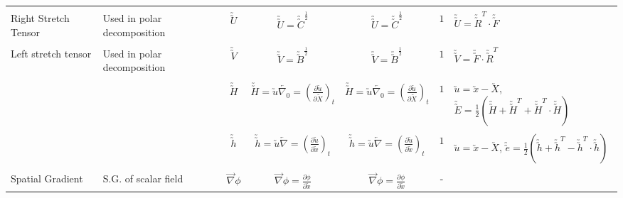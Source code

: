 \documentclass[10pt]{article}
\begin{document}
\begin{center}
\begin{tabular}{l m{3in} c c c c m{5in}}
\\[1ex]
\hline
\\[-1ex]
Right Stretch Tensor
&%
Used in polar decomposition
&%
$ \utilde{\utilde{U}} $
&%
$ \utilde{\utilde{U}} =\utilde{\utilde{C}}^{\frac{1}{2}}$
&%
$ \utilde{\utilde{U}} =\utilde{\utilde{C}}^{\frac{1}{2}}$
&%
$ 1 $
&%
$\utilde{\utilde{U}}=\utilde{\utilde{R}}^{T}\cdot\utilde{\utilde{F}}$
\\[1ex]
\hline
\\[-1ex]
Left stretch tensor
&%
Used in polar decomposition
&%
$ \utilde{\utilde{V}} $
&%
$ \utilde{\utilde{V}} =\utilde{\utilde{B}}^{\frac{1}{2}}$
&%
$ \utilde{\utilde{V}} =\utilde{\utilde{B}}^{\frac{1}{2}}$
&%
$ 1 $
&%
$\utilde{\utilde{V}}=\utilde{\utilde{F}}\cdot\utilde{\utilde{R}}^{T}$
\\[1ex]




\hline
\\[-1ex]

&%

&%
$ \utilde{\utilde{H}} $
&%
$ \utilde{\utilde{H}} = \utilde{u}\overleftarrow{\nabla_{0}}=(\frac{\partial \utilde{u}}{\partial \utilde{X}})_{t}$
&%
$ \utilde{\utilde{H}} = \utilde{u}\overleftarrow{\nabla_{0}}=(\frac{\partial \utilde{u}}{\partial \utilde{X}})_{t}$
&%
$ 1 $
&%
$\utilde{u}=\utilde{x}-\utilde{X}$, $\utilde{\utilde{E}}=\frac{1}{2}(\utilde{\utilde{H}}+\utilde{\utilde{H}}^{T}+\utilde{\utilde{H}}^{T}\cdot\utilde{\utilde{H}})$
\\[1ex]
\hline
\\[-1ex]

&%

&%
$ \utilde{\utilde{h}} $
&%
$ \utilde{\utilde{h}} = \utilde{u}\overleftarrow{\nabla}=(\frac{\partial \utilde{u}}{\partial \utilde{x}})_{t}$
&%
$ \utilde{\utilde{h}} = \utilde{u}\overleftarrow{\nabla}=(\frac{\partial \utilde{u}}{\partial \utilde{x}})_{t}$
&%
$ 1 $
&%
$\utilde{u}=\utilde{x}-\utilde{X}$, $\utilde{\utilde{e}}=\frac{1}{2}(\utilde{\utilde{h}}+\utilde{\utilde{h}}^{T}-\utilde{\utilde{h}}^{T}\cdot\utilde{\utilde{h}})$
\\[1ex]
\hline
\\[-1ex]
Spatial Gradient
&%
S.G. of scalar field
&%
$ \overrightarrow{\nabla}\phi $
&%
$ \overrightarrow{\nabla}\phi = \frac{\partial \phi}{\partial \utilde{x}} $
&%
$ \overrightarrow{\nabla}\phi = \frac{\partial \phi}{\partial \utilde{x}} $
&%
-
&%
 

\end{tabular}
\end{center}
\end{document}
